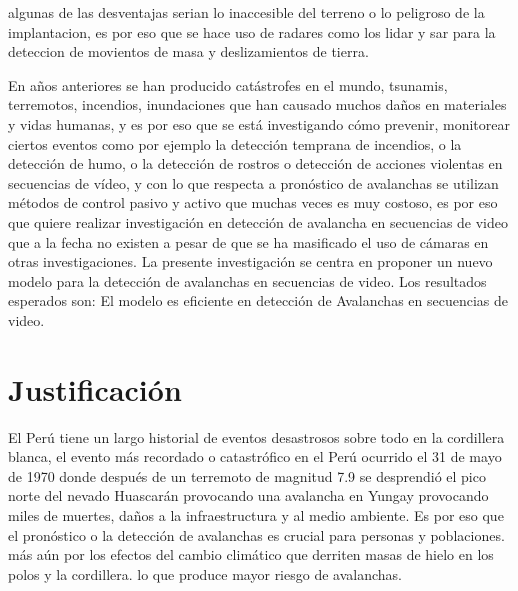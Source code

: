 \documentclass[a4paper,11pt]{report}
\begin{document}



algunas de las desventajas  serian lo inaccesible del terreno o lo peligroso de la implantacion, es por eso que se hace uso de radares
como los lidar y sar para la deteccion de movientos de masa y deslizamientos de tierra.


En años anteriores se han producido catástrofes en el mundo, tsunamis, terremotos, incendios, inundaciones que  han causado  muchos daños en  materiales y  vidas humanas, y es por eso que se está investigando cómo prevenir, monitorear ciertos eventos como por ejemplo la detección temprana de incendios, o la detección de humo, o la detección de rostros o detección de acciones violentas en secuencias de vídeo, y con lo que respecta a pronóstico de avalanchas se utilizan métodos de control pasivo y activo que muchas veces es muy costoso, es por eso que quiere realizar investigación en   detección de avalancha en secuencias de video que a la fecha no existen a pesar de que se ha masificado el uso de cámaras en otras investigaciones.
 La presente investigación se centra en proponer un nuevo modelo para la detección de avalanchas en secuencias de video. Los resultados esperados son: El modelo es eficiente en detección  de Avalanchas en secuencias de video.



\section{Justificación}
El Perú tiene un largo historial de eventos desastrosos sobre todo en la cordillera blanca, el evento más recordado o catastrófico en el Perú ocurrido el 31 de mayo de 1970 donde después de un terremoto de magnitud 7.9 se desprendió el pico norte del nevado Huascarán provocando una avalancha en Yungay provocando miles de muertes, daños a la infraestructura y al medio ambiente.
Es por eso que el pronóstico o la detección de avalanchas es crucial para personas y poblaciones. más aún por los efectos del cambio climático que derriten masas de hielo en los polos y la cordillera. lo que produce mayor riesgo de avalanchas.
\end{document}
